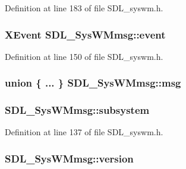 Definition at line 183 of file S\-D\-L\-\_\-syswm.\-h.

\hypertarget{struct_s_d_l___sys_w_mmsg_ae32f04e3b3707a452cbb4ed416d56c64}{
\subsubsection[{event}]{\setlength{\rightskip}{0pt plus 5cm}X\-Event S\-D\-L\-\_\-\-Sys\-W\-Mmsg\-::event}}\label{struct_s_d_l___sys_w_mmsg_ae32f04e3b3707a452cbb4ed416d56c64}


Definition at line 150 of file S\-D\-L\-\_\-syswm.\-h.

\hypertarget{struct_s_d_l___sys_w_mmsg_a76c9fec05f26001312055dce455e0b76}{
\subsubsection[{msg}]{\setlength{\rightskip}{0pt plus 5cm}union \{ ... \}   S\-D\-L\-\_\-\-Sys\-W\-Mmsg\-::msg}}\label{struct_s_d_l___sys_w_mmsg_a76c9fec05f26001312055dce455e0b76}
\hypertarget{struct_s_d_l___sys_w_mmsg_a7c3900af5ea797f1318fc77ee0ecd11b}{
\subsubsection[{subsystem}]{ S\-D\-L\-\_\-\-Sys\-W\-Mmsg\-::subsystem}}\label{struct_s_d_l___sys_w_mmsg_a7c3900af5ea797f1318fc77ee0ecd11b}


Definition at line 137 of file S\-D\-L\-\_\-syswm.\-h.

\hypertarget{struct_s_d_l___sys_w_mmsg_a95f9aae58d18ee8fac556416b322a5fb}{
\subsubsection[{version}]{ S\-D\-L\-\_\-\-Sys\-W\-Mmsg\-::version}}\label{struct_s_d_l___sys_w_mmsg_a95f9aae58d18ee8fac556416b322a5fb}


